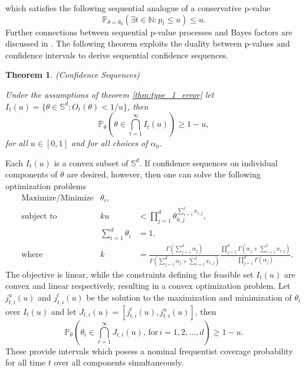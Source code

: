 \documentclass[11pt]{article}
\newtheorem{thm}{Theorem}[section]
\begin{document}
which satisfies the following sequential analogue of a conservative p-value
\begin{equation}
  \label{eq:conservative_p_value}
  \mathbb{P}_{\theta = \theta_0}\left( \exists t \in \mathbb{N}: p_t \leq u \right) \leq u.
\end{equation}
Further connections between sequential p-value processes and Bayes factors are discussed in \cite{shafer}.
The following theorem exploits the duality between p-values and confidence intervals to derive sequential confidence sequences.
\begin{thm}(Confidence Sequences)
  
  \label{thm:confidence_sequence}
  \noindent Under the assumptions of theorem \ref{thm:type_1_error} let $I_t(u) = \lbrace \theta \in \mathbb{S}^d : O_t(\theta) < 1/u  \rbrace$, then
\begin{equation}
  \label{eq:confidence_sequence}
  \mathbb{P}_{\theta}\left( \theta \in \bigcap_{t=1}^{\infty} I_t(u) \right) \geq 1- u,
\end{equation}
for all $u \in [0,1]$ and for all choices of $\alpha_0$.

\end{thm}
\noindent Each $I_t(u)$ is a convex subset of $\mathbb{S}^d$.
If confidence sequences on individual components of $\theta$ are desired, however, then one can solve the following
optimization problems
\begin{align*}
  &\text{Maximize/Minimize} &\theta_i, &\\
  &\text{subject to}  &ku &< \prod_{j=1}^{d} \theta_{0,j}^{\sum_{i=1}^{t}x_{i,j}},\\
    &              &\sum_{i=1}^{d}\theta_i &= 1,\\
  &\text{where} &k &= \frac{\Gamma(\sum_{j=1}^{d} \alpha_j)}{\Gamma(\sum_{j=1}^{d} \alpha_j + \sum_{i=1}^{t}x_{i,j})}\frac{\prod_{j=1}^{d}\Gamma(\alpha_j + \sum_{i=1}^{t}x_{i,j} )}{\prod_{j=1}^{d}\Gamma(\alpha_j )}.
\end{align*}
The objective is linear, while the constraints defining the feasible set $I_t(u)$ are convex and linear respectively, resulting in a convex optimization problem.
Let $j^{u}_{t,i}(u)$ and $j^{l}_{t,i}(u)$ be the solution to the maximization and minimization of $\theta_i$ over $I_t(u)$ and let $J_{t,i}(u)=[j^{l}_{t,i}(u), j^{u}_{t,i}(u)]$, then
\begin{equation}
  \label{eq:marginal_confidence_sequence}
  \mathbb{P}_{\theta}\left( \theta_i \in \bigcap_{t=1}^{\infty} J_{t,i}(u),\, \text{for}\, i = 1,2, \dots, d \right) \geq 1- u.
\end{equation}
These provide intervals which posess a nominal frequentist coverage probability for all time $t$ over all components simultaneously.
\end{document}
